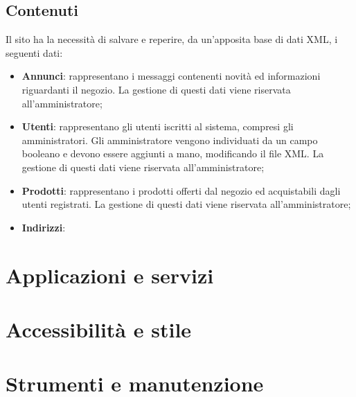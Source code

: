 	\subsection{Contenuti}
	Il sito ha la necessità di salvare e reperire, da un'apposita base di dati XML, i seguenti dati:
	\begin{itemize}
		\item \textbf{Annunci}: rappresentano i messaggi contenenti novità ed informazioni riguardanti il negozio. La gestione di questi dati viene riservata all'amministratore;
		\item \textbf{Utenti}: rappresentano gli utenti iscritti al sistema, compresi gli amministratori. Gli amministratore vengono individuati da un campo booleano e devono essere aggiunti a mano, modificando il file XML. La gestione di questi dati viene riservata all'amministratore;
		\item \textbf{Prodotti}: rappresentano i prodotti offerti dal negozio ed acquistabili dagli utenti registrati. La gestione di questi dati viene riservata all'amministratore;
		\item \textbf{Indirizzi}:
	\end{itemize}
\section{Applicazioni e servizi} %

\section{Accessibilità e stile} %

\section{Strumenti e manutenzione} %

